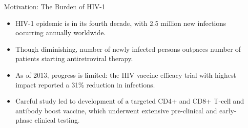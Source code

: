 \documentclass{beamer}
\begin{document}

\begin{frame}[c]{Motivation: The Burden of HIV-1}

\begin{center}
\begin{itemize}
  \itemsep10pt
  \item HIV-1 epidemic is in its fourth decade, with 2.5 million new infections
    occurring annually worldwide.
  \item Though diminishing, number of newly infected persons outpaces number of
    patients starting antiretroviral therapy.
  \item As of 2013, progress is limited: the HIV vaccine efficacy trial with
    highest impact reported a 31\% reduction in infections.
  \item Careful study led to development of a targeted CD4+ and CD8+ T-cell and
    antibody boost vaccine, which underwent extensive pre-clinical and
    early-phase clinical testing.
\end{itemize}
\end{center}

\note{
}

\end{frame}
\end{document}
